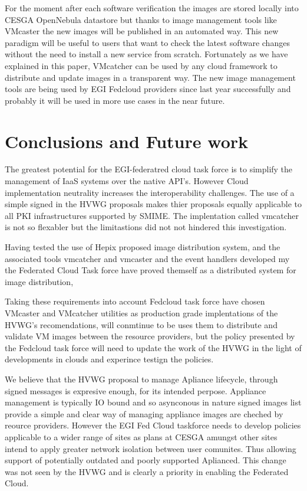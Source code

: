 \documentclass{llncs_Ibergrid2013}
\begin{document}
For the moment after each software verification the images are stored locally into CESGA OpenNebula datastore but thanks to image management tools like VMcaster the new images will be published in an automated way.
This new paradigm will be useful to users that want to check the latest software changes without the need to install a new service from scratch.
Fortunately as we have explained in this paper, VMcatcher can be used by any cloud framework to distribute and update images in a transparent way. 
The new image management tools are being used by EGI Fedcloud providers since last year successfully and probably it will be used in more use cases in the near future.

\section{Conclusions and Future work}
\label{sect-conclusions}
The greatest potential for the EGI-federatred cloud task force is to simplify the management of IaaS systems over the native API's.
However Cloud implementation neutrality increases the interoperability challenges. The use of a simple signed in the HVWG proposals makes thier proposals equally applicable to all PKI infrastructures supported by SMIME. The implentation called vmcatcher is not so flexabler but the limitastions did not not hindered this investigation.

Having tested the use of Hepix proposed image distribution system, and the associated tools vmcatcher and vmcaster and the event handlers developed my the Federated Cloud Task force have proved themself as a distributed system for image distribution, 

Taking these requirements into account Fedcloud task force have chosen VMcaster and VMcatcher utilities as production grade implentations of the HVWG's recomendations, will conmtinue to be uses them to distribute and validate VM images between the resource providers, but the policy presented by the Fedcloud task force will need to update the work of the HVWG in the light of developments in clouds and experince testign the policies.

We believe that the HVWG proposal to manage Apliance lifecycle, through signed messages is expresive enough, for its intended perpose. Appliance management is typically IO bound and so asynconous in nature signed images list provide a simple and clear way of managing appliance images are cheched by reource providers. However the EGI Fed Cloud taskforce needs to develop policies applicable to a wider range of sites as plans at CESGA amungst other sites intend to apply greater network isolation between user comunites. Thus allowing support of potentially outdated and poorly supported Aplianced. This change was not seen by the HVWG and is clearly a priority in enabling the Federated Cloud.
\end{document}
